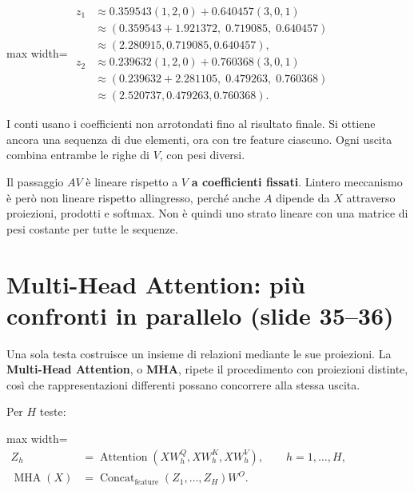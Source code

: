 \documentclass[11pt,a4paper,oneside,openany]{book}
\begin{document}
\begin{center}
\begin{adjustbox}{max width=\linewidth}
$\displaystyle 
\begin{aligned}
z_1&\approx0.359543(1,2,0)+0.640457(3,0,1)\\
&\approx(0.359543+1.921372,\;0.719085,\;0.640457)\\
&\approx(2.280915,0.719085,0.640457),\\
z_2&\approx0.239632(1,2,0)+0.760368(3,0,1)\\
&\approx(0.239632+2.281105,\;0.479263,\;0.760368)\\
&\approx(2.520737,0.479263,0.760368).
\end{aligned}
$
\end{adjustbox}
\end{center}

I conti usano i coefficienti non arrotondati fino al risultato finale. Si ottiene ancora una sequenza di due elementi, ora con tre feature ciascuno. Ogni uscita combina entrambe le righe di \(V\), con pesi diversi.

Il passaggio \(AV\) è lineare rispetto a \(V\) \textbf{a coefficienti fissati}. L\textquotesingle intero meccanismo è però non lineare rispetto all\textquotesingle ingresso, perché anche \(A\) dipende da \(X\) attraverso proiezioni, prodotti e softmax. Non è quindi uno strato lineare con una matrice di pesi costante per tutte le sequenze.

\section{Multi-Head Attention: più confronti in parallelo (slide 35--36)}\label{f04-r716}

Una sola testa costruisce un insieme di relazioni mediante le sue proiezioni. La \textbf{Multi-Head Attention}, o \textbf{MHA}, ripete il procedimento con proiezioni distinte, così che rappresentazioni differenti possano concorrere alla stessa uscita.

Per \(H\) teste:

\begin{center}
\begin{adjustbox}{max width=\linewidth}
$\displaystyle \boxed{\begin{aligned}
Z_h&=\operatorname{Attention}(XW_h^Q,XW_h^K,XW_h^V),\qquad h=1,\ldots,H,\\
\operatorname{MHA}(X)&=\operatorname{Concat}_{\mathrm{feature}}(Z_1,\ldots,Z_H)W^O.
\end{aligned}}$
\end{adjustbox}
\end{center}
\end{document}
